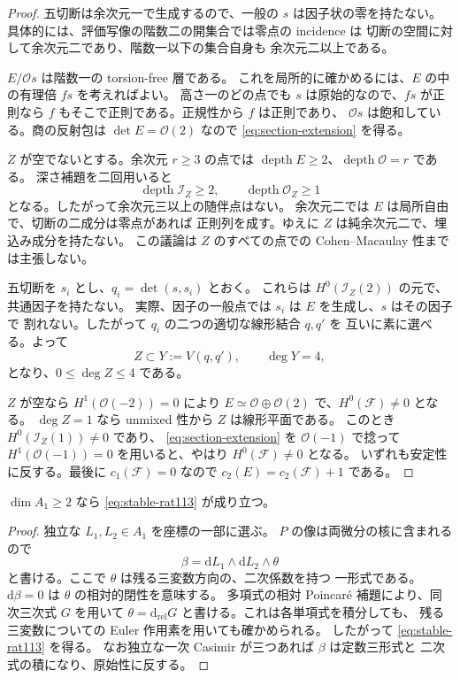 \begin{proof}
五切断は余次元一で生成するので、一般の $s$ は因子状の零を持たない。
具体的には、評価写像の階数二の開集合では零点の incidence は
切断の空間に対して余次元二であり、階数一以下の集合自身も
余次元二以上である。

$E/\mathcal O s$ は階数一の torsion-free 層である。
これを局所的に確かめるには、$E$ の中の有理倍 $f s$ を考えればよい。
高さ一のどの点でも $s$ は原始的なので、$f s$ が正則なら
$f$ もそこで正則である。正規性から $f$ は正則であり、
$\mathcal O s$ は飽和している。商の反射包は $\det E=\mathcal O(2)$ なので
\eqref{eq:section-extension} を得る。

$Z$ が空でないとする。余次元 $r\geq3$ の点では
$\operatorname{depth}E\geq2$、$\operatorname{depth}\mathcal O=r$ である。
深さ補題を二回用いると
\[
 \operatorname{depth}\mathcal I_Z\geq2,
 \qquad \operatorname{depth}\mathcal O_Z\geq1
\]
となる。したがって余次元三以上の随伴点はない。
余次元二では $E$ は局所自由で、切断の二成分は零点があれば
正則列を成す。ゆえに $Z$ は純余次元二で、埋込み成分を持たない。
この議論は $Z$ のすべての点での Cohen--Macaulay 性までは主張しない。

五切断を $s_i$ とし、$q_i=\det(s,s_i)$ とおく。
これらは $H^0(\mathcal I_Z(2))$ の元で、共通因子を持たない。
実際、因子の一般点では $s_i$ は $E$ を生成し、$s$ はその因子で
割れない。したがって $q_i$ の二つの適切な線形結合 $q,q'$ を
互いに素に選べる。よって
\[
 Z\subset Y:=V(q,q'),\qquad \deg Y=4,
\]
となり、$0\leq\deg Z\leq4$ である。

$Z$ が空なら $H^1(\mathcal O(-2))=0$ により
$E\simeq\mathcal O\oplus\mathcal O(2)$ で、$H^0(\mathcal F)\neq0$ となる。
$\deg Z=1$ なら unmixed 性から $Z$ は線形平面である。
このとき $H^0(\mathcal I_Z(1))\neq0$ であり、
\eqref{eq:section-extension} を $\mathcal O(-1)$ で捻って
$H^1(\mathcal O(-1))=0$ を用いると、やはり $H^0(\mathcal F)\neq0$ となる。
いずれも安定性に反する。最後に $c_1(\mathcal F)=0$ なので
$c_2(E)=c_2(\mathcal F)+1$ である。
\end{proof}

\begin{lemma}
\label{lem:two-linear-casimirs-rat113}
$\dim A_1\geq2$ なら \eqref{eq:stable-rat113} が成り立つ。
\end{lemma}

\begin{proof}
独立な $L_1,L_2\in A_1$ を座標の一部に選ぶ。
$P$ の像は両微分の核に含まれるので
\[
 \beta=\mathrm{d} L_1\wedge\mathrm{d} L_2\wedge\theta
\]
と書ける。ここで $\theta$ は残る三変数方向の、二次係数を持つ
一形式である。$\mathrm{d}\beta=0$ は $\theta$ の相対的閉性を意味する。
多項式の相対 Poincar\'e 補題により、同次三次式 $G$ を用いて
$\theta=\mathrm{d}_{\mathrm{rel}}G$ と書ける。これは各単項式を積分しても、
残る三変数についての Euler 作用素を用いても確かめられる。
したがって \eqref{eq:stable-rat113} を得る。
なお独立な一次 Casimir が三つあれば $\beta$ は定数三形式と
二次式の積になり、原始性に反する。
\end{proof}

